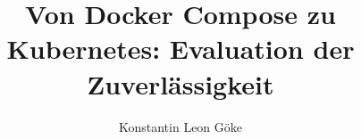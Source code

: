 \documentclass[]{htwg-report}
\begin{document}
\frontmatter



\title[Kubernetes-Evaluation]{Von Docker Compose zu Kubernetes: Evaluation der Zuverlässigkeit}
\author{Konstantin Leon Göke}


\makecover[]
%          




\tableofcontents

\mainmatter








\appendix

%

\printbibliography
\end{document}
